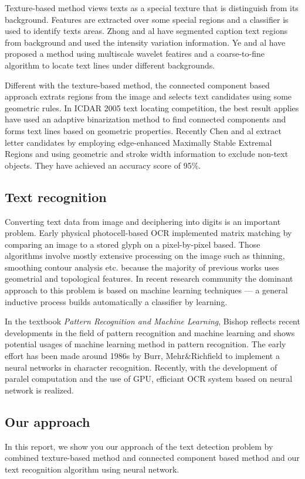 \documentclass[paper=a4, french, 11pt]{scrartcl}
\begin{document}
Texture-based method views texts as a special texture that is distinguish from its background. Features are extracted over some special regions and a classifier is used to identify texts areas. Zhong and al have segmented caption text regions from background and used the intensity variation information. Ye and al have proposed a method using multiscale wavelet featires and a coarse-to-fine algorithm to locate text lines under different backgrounds.

Different with the texture-based method, the connected component based approach extrats regions from the image and selects text candidates using some geometric rules. In ICDAR 2005 text locating competition, the best result applies have used an adaptive binarization method to find connected components and forms text lines based on geometric properties. Recently Chen and al extract letter candidates by employing edge-enhanced Maximally Stable Extremal Regions and using geometric and stroke width information to exclude non-text objects. They have achieved an accuracy score of 95\%.

\subsection{Text recognition}
Converting text data from image and deciphering into digits is an important problem. Early physical photocell-based OCR implemented matrix matching by comparing an image to a stored glyph on a pixel-by-pixel based. Those algorithms involve mostly extensive processing on the image such as thinning, smoothing contour analysis etc. because the majority of previous works uses geometrial and topological features. In recent research community the dominant approach to this problem is based on machine learning techniques --- a general inductive process builds automatically a classifier by learning.

In the textbook \textit{Pattern Recognition and Machine Learning}, Bishop reflects recent developments in the field of pattern recognition and machine learning and shows potential usages of machine learning method in pattern recognition. The early effort has been made around 1986s by Burr, Mehr\&Richfield to implement a neural networks in character recognition. Recently, with the development of paralel computation and the use of GPU, efficiant OCR system based on neural network is realized. 

\subsection{Our approach}
In this report, we show you our approach of the text detection problem by combined texture-based method and connected component based method and our text recognition algorithm using neural network. 
\end{document}
